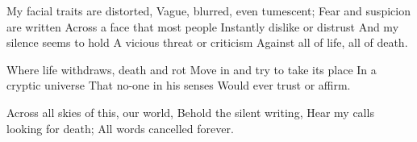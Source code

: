\documentclass{article}
\newenvironment{stanza}{\begin{minipage}{10cm}\obeylines}{\end{minipage}\vspace{\baselineskip}}
\begin{document}
\begin{stanza}
My facial traits are distorted,
Vague, blurred, even tumescent;
Fear and suspicion are written
Across a face that most people
Instantly dislike or distrust
And my silence seems to hold
A vicious threat or criticism
Against all of life, all of death.
\end{stanza}

\begin{stanza}
Where life withdraws, death and rot
Move in and try to take its place
In a cryptic universe
That no-one in his senses
Would ever trust or affirm.
\end{stanza}

\begin{stanza}
Across all skies of this, our world,
Behold the silent writing,
Hear my calls looking for death;
All words cancelled forever.
\end{stanza}

\iffalse
\fi
\end{document}
